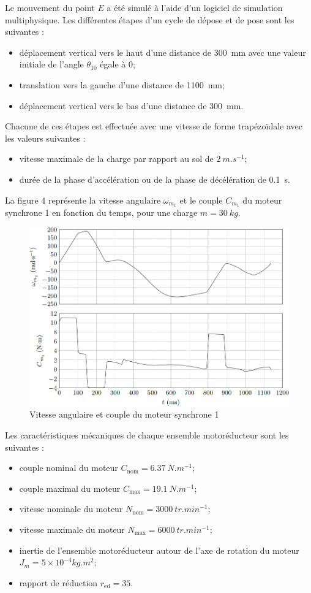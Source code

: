 \documentclass[10pt,fleqn]{article} %
\begin{document}
\ifprof
\else

Le mouvement du point $E$ a été simulé à l’aide d’un logiciel de simulation multiphysique. Les différentes étapes d’un cycle de dépose et de pose sont les suivantes :
\begin{itemize}
\item déplacement vertical vers le haut d’une distance de \SI{300}{mm} avec une valeur initiale de l’angle $\theta_{10}$  égale à 0\degres ;
\item translation vers la gauche d’une distance de \SI{1100}{mm};
\item déplacement vertical vers le bas d’une distance de \SI{300}{mm}.
\end{itemize}
Chacune de ces étapes est effectuée avec une vitesse de forme trapézoïdale avec les valeurs suivantes :
\begin{itemize}
\item vitesse maximale de la charge par rapport au sol de $\SI{2}{m.s^{-1}}$;
\item durée de la phase d’accélération ou de la phase de décélération de \SI{0,1}{s}.
\end{itemize}
La figure 4 représente la vitesse angulaire $\omega_{m_1}$ et le couple $C_{m_1}$ du moteur synchrone 1 en fonction du temps,
pour une charge $m = \SI{30}{kg}$.


\begin{figure}[H]
\centering
\includegraphics[width=0.9\linewidth]{fig_04}
\caption{Vitesse angulaire et couple du moteur synchrone 1 \label{fig_04}}
\end{figure}


Les caractéristiques mécaniques de chaque ensemble motoréducteur sont les suivantes :
\begin{itemize}
\item couple nominal du moteur $C_{\text{nom}} = \SI{6,37}{N.m^{-1}}$;
\item couple maximal du moteur $C_{\text{max}} = \SI{19,1}{N.m^{-1}}$;
\item vitesse nominale du moteur $N_{\text{nom}} = \SI{3000}{tr.min^{-1}}$;
\item vitesse maximale du moteur $N_{\text{max}} = \SI{6000}{tr.min^{-1}}$;
\item inertie de l’ensemble motoréducteur autour de l’axe de rotation du moteur $J_m = 5\times 10^{-4} \si{kg.m^2}$;
\item rapport de réduction $r_{\text{ed}} = 35$.
\end{itemize}
\end{document}
